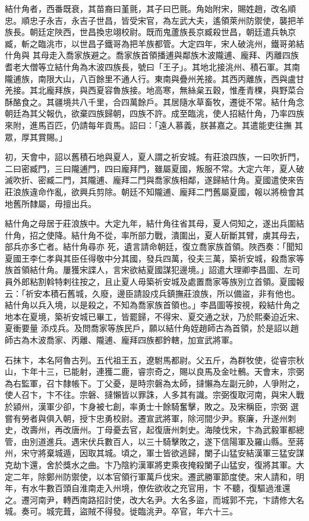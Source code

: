 \begin{pinyinscope}
 結什角者，西番既衰，其苗裔曰堇氈，其子曰巴氈。角始附宋，賜姓趙，改名順忠。順忠子永吉，永吉子世昌，皆受宋官，為左武大夫，遙領萊州防禦使，襲把羊族長。朝廷定陜西，世昌換忠翊校尉。既而鬼蘆族長京臧殺世昌，朝廷遣兵執京臧，斬之臨洮市，以世昌子鐵哥為把羊族都管。大定四年，宋人破洮州，鐵哥弟結什角與
 其母走入喬家族避之。喬家族首領播逋與鄰族木波隴逋、龐拜、丙離四族耆老大僧等立結什角為木波四族長，號曰「王子」。其地北接洮州、積石軍。其南隴逋族，南限大山，八百餘里不通人行。東南與疊州羌接。其西丙離族，西與盧甘羌接。其北龐拜族，與西夏容魯族接。地高寒，無絲枲五穀，惟產青稞，與野菜合酥酪食之。其疆境共八千里，合四萬餘戶。其居隨水草畜牧，遷徙不常。結什角念朝廷為其父報仇，欲棄四族歸朝，四族不許。成至臨洮，使人招結什角，乃率四族來附，進馬百匹，仍請每年貢馬。詔曰：「遠人慕義，朕甚嘉之。其遣能吏往撫
 其眾，厚其賞賜。」



 初，天會中，詔以舊積石地與夏人，夏人謂之祈安城。有莊浪四族，一曰吹折門，二曰密臧門，三曰隴逋門，四曰龐拜門，雖屬夏國，叛服不常。大定六年，夏人破滅吹折、密臧二門，其隴逋、龐拜二門與喬家族相鄰，遂歸結什角。夏國遣使來告莊浪族違命作亂，欲興兵剪除。朝廷不知隴逋、龐拜二門舊屬夏國，報以將檢會其地舊所隸屬，毋擅出兵。



 結什角之母居于莊浪族中。大定九年，結什角往省其母，夏人伺知之，遂出兵圍結什角，招之使降。結什角不從，率所部力戰，潰圍出，夏人斫斷其臂，虜其母去，部兵亦多亡者。結什角尋亦
 死，遺言請命朝廷，復立喬家族首領。陜西奏：「聞知夏國王李仁孝與其臣任得敬中分其國，發兵四萬，役夫三萬，築祈安城，殺喬家等族首領結什角。屢獲宋諜人，言宋欲結夏國謀犯邊境。」詔遣大理卿李昌圖、左司員外郎粘割斡特剌往按之，且止夏人毋築祈安城及處置喬家等族別立首領。夏國報云：「祈安本積石舊城，久廢，邊臣請設戍兵鎮撫莊浪族，所以備盜，非有他也。結什角以兵入境，以是殺之，不知為喬家族首領也。」李昌圖等按視，殺結什角之地本在夏境，築祈安城已畢工，皆罷歸，不得宋、夏交通之狀，乃於熙秦迫近宋、夏衝要量
 添戍兵。及問喬家等族民戶，願以結什角姪趙師古為首領，於是詔以趙師古為木波喬家、丙離、隴逋、龐拜四族都鈐轄，加宣武將軍。



 石抹卞，本名阿魯古列。五代祖王五，遼駙馬都尉。父五斤，為群牧使，從睿宗秋山，卞年十三，已能射，連獲二鹿，睿宗奇之，賜以良馬及金吐鶻。天會末，宗弼為右監軍，召卞隸帳下。丁父憂，是時宗磐為太師，撻懶為左副元帥，人爭附之，使人召卞，卞不往。宗磐、撻懶皆以罪誅，人多其有識。宗弼復取河南，與宋人戰於潁州，漢軍少卻，卞身被七創，率勇士十餘騎奮擊，敗之。及宋稱臣，宗弼
 選嘗有勞者與俱入朝，授卞忠勇校尉。遷宣武將軍，除河間少尹。察廉，升遂州刺史，改壽州，再改唐州。丁母憂去官，起復唐州刺史。海陵伐宋，卞為武毅軍都總管，由別道進兵。遇宋伏兵數百人，以三十騎擊敗之，遂下信陽軍及羅山縣。至蔣州，宋守將棄城遁，因取其城。頃之，軍士皆欲逃歸，闌子山猛安結漢軍三猛安謀克劫卞還，舍於獎水之曲。卞乃陰約漢軍將吏乘夜掩殺闌子山猛安，復將其軍。大定二年，除鄭州防禦使，以本官領行軍萬戶伐宋。遷武勝軍節度使。宋人請和，明年，有水牛數百頭自淮南走入州境，僚佐欲收之充官用，卞
 不聽，復驅過淮還之。遷河南尹，轉西南路招討使，改大名尹。大名多盜，而城郭不完，卞請修大名城。奏可。城完葺，盜賊不得發。徙臨洮尹。卒官，年六十三。




\end{pinyinscope}
